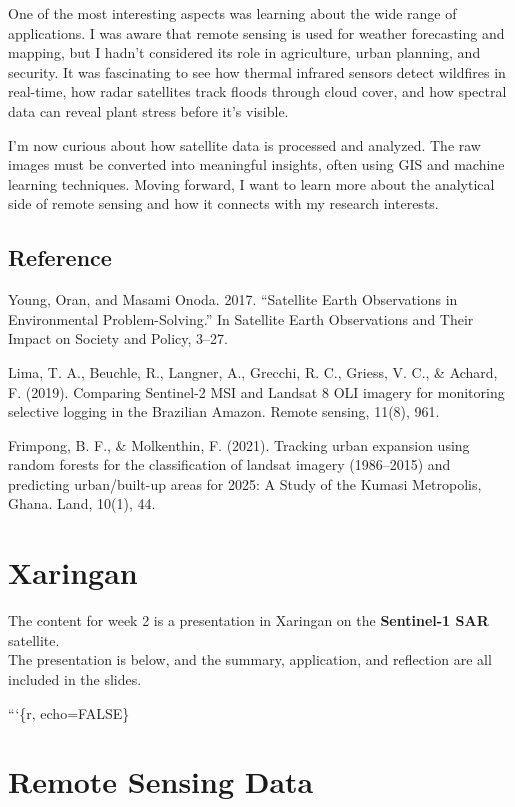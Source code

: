\documentclass[
  letterpaper,
]{scrbook}
\begin{document}
One of the most interesting aspects was learning about the wide range of
applications. I was aware that remote sensing is used for weather
forecasting and mapping, but I hadn't considered its role in
agriculture, urban planning, and security. It was fascinating to see how
thermal infrared sensors detect wildfires in real-time, how radar
satellites track floods through cloud cover, and how spectral data can
reveal plant stress before it's visible.

I'm now curious about how satellite data is processed and analyzed. The
raw images must be converted into meaningful insights, often using GIS
and machine learning techniques. Moving forward, I want to learn more
about the analytical side of remote sensing and how it connects with my
research interests.

\section{Reference}\label{reference}

Young, Oran, and Masami Onoda. 2017. ``Satellite Earth Observations in
Environmental Problem-Solving.'' In Satellite Earth Observations and
Their Impact on Society and Policy, 3--27.

Lima, T. A., Beuchle, R., Langner, A., Grecchi, R. C., Griess, V. C., \&
Achard, F. (2019). Comparing Sentinel-2 MSI and Landsat 8 OLI imagery
for monitoring selective logging in the Brazilian Amazon. Remote
sensing, 11(8), 961.

Frimpong, B. F., \& Molkenthin, F. (2021). Tracking urban expansion
using random forests for the classification of landsat imagery
(1986--2015) and predicting urban/built-up areas for 2025: A Study of
the Kumasi Metropolis, Ghana. Land, 10(1), 44.


\chapter{Xaringan}\label{xaringan}

The content for week 2 is a presentation in Xaringan on the
\textbf{Sentinel-1 SAR} satellite.\\
The presentation is below, and the summary, application, and reflection
are all included in the slides.

```\{r, echo=FALSE\}


\chapter{Remote Sensing Data}\label{remote-sensing-data}
\end{document}
